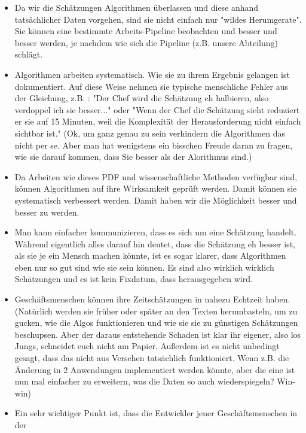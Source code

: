 \begin{itemize}
\tightlist
\item 
    Da wir die Schätzungen Algorithmen überlassen und diese anhand tatsächlicher Daten vorgehen, 
    sind sie nicht einfach nur "wildes Herumgerate". 
    Sie können eine bestimmte Arbeits-Pipeline beobachten und besser und besser werden, je nachdem 
    wie sich die Pipeline (z.B. unsere Abteilung) schlägt.
\item
    Algorithmen arbeiten systematisch. 
    Wie sie zu ihrem Ergebnis gelangen ist dokumentiert. 
    Auf diese Weise nehmen sie typische menschliche Fehler aus der Gleichung, z.B. : 
    "Der Chef wird die Schätzung eh halbieren, also verdoppel ich sie besser..." 
    oder 
    "Wenn der Chef die Schätzung sieht reduziert er sie auf 15 Minuten, weil die 
    Komplexität der Herausforderung nicht einfach sichtbar ist." 
    (Ok, um ganz genau zu sein verhindern die Algorithmen das nicht per se. 
    Aber man hat wenigstens ein bisschen Freude daran zu fragen, wie sie darauf kommen, 
    dass Sie besser als der Alorithmus sind.)
\item
    Da Arbeiten wie dieses PDF und wissenschaftliche Methoden verfügbar sind, können 
    Algorithmen auf ihre Wirksamkeit geprüft werden. 
    Damit können sie systematisch verbessert werden. 
    Damit haben wir die Möglichkeit besser und besser zu werden.
\item
    Man kann einfacher kommunizieren, dass es sich um eine Schätzung handelt. 
    Während eigentlich alles darauf hin deutet, dass die Schätzung eh besser ist, 
    als sie je ein Mensch machen könnte, ist es sogar klarer, dass Algorithmen eben 
    nur so gut sind wie sie sein können. 
    Es sind also wirklich wirklich Schätzungen und es ist kein Fixdatum, dass herausgegeben wird.
\item
    Geschäftsmenschen können ihre Zeitschätzungen in nahezu Echtzeit haben. 
    (Natürlich werden sie früher oder später an den Texten herumbasteln, um zu gucken, 
    wie die Algos funktionieren und wie sie sie zu günstigen Schätzungen beschupsen. 
    Aber der daraus entstehende Schaden ist klar ihr eigener, also los Jungs, 
    schneidet euch nicht am Papier. 
    Außerdem ist es nicht unbedingt gesagt, dass das nicht aus Versehen tatsächlich 
    funktioniert. 
    Wenn z.B. die Änderung in 2 Anwendungen implementiert werden könnte, 
    aber die eine ist nun mal einfacher zu erweitern, was die Daten so auch 
    wiederspiegeln? Win-win)
\item
    Ein sehr wichtiger Punkt ist, dass die Entwickler jener Geschäftsmenschen in der 

\end{itemize}
